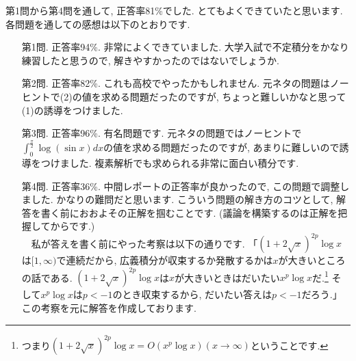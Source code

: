 \documentclass[dvipdfmx,a4paper,11pt]{article}
\theoremstyle{definition}
\begin{document}
第1問から第4問を通して, 正答率81\%でした. とてもよくできていたと思います. 
各問題を通しての感想は以下のとおりです.
\begin{itemize}
\item [第1問.] 正答率94\%. 非常によくできていました. 大学入試で不定積分をかなり練習したと思うので, 解きやすかったのではないでしょうか. 
\item [第2問.] 正答率82\%. これも高校でやったかもしれません. 元ネタの問題はノーヒントで(2)の値を求める問題だったのですが, ちょっと難しいかなと思って(1)の誘導をつけました.
\item [第3問.] 正答率96\%. 有名問題です. 元ネタの問題ではノーヒントで$\int_{0}^{\frac{\pi}{2}} \log (\sin x) dx$の値を求める問題だったのですが, あまりに難しいので誘導をつけました. 複素解析でも求められる非常に面白い積分です.
\item [第4問.] 正答率36\%. 中間レポートの正答率が良かったので, この問題で調整しました. かなりの難問だと思います. こういう問題の解き方のコツとして, 解答を書く前におおよその正解を掴むことです. (議論を構築するのは正解を把握してからです.) \\
　私が答えを書く前にやった考察は以下の通りです.
「$(1 + 2 \sqrt{x})^{2p} \log x$は$[1, \infty)$で連続だから, 広義積分が収束するか発散するかは$x$が大きいところの話である. $(1 + 2 \sqrt{x})^{2p} \log x$は$x$が大きいときはだいたい$x^p \log x$だ.\footnote{つまり$(1 + 2 \sqrt{x})^{2p} \log x = O(x^p \log x) (x \rightarrow \infty)$ということです.} そして$x^p \log x$は$p<-1$のとき収束するから, だいたい答えは$p<-1$だろう.」 
この考察を元に解答を作成しております. 
\end{itemize}



 
\end{document}
